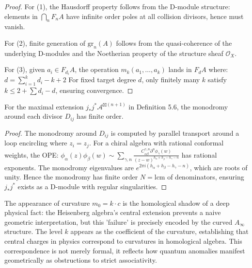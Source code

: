\begin{proof}
For (1), the Hausdorff property follows from the D-module structure: elements in $\bigcap_n F_nA$ have infinite order poles at all collision divisors, hence must vanish.

For (2), finite generation of $\text{gr}_n(A)$ follows from the quasi-coherence of the underlying D-modules and the Noetherian property of the structure sheaf $\mathcal{O}_X$.

For (3), given $a_i \in F_{d_i}A$, the operation $m_k(a_1, \ldots, a_k)$ lands in $F_d A$ where:
$d = \sum_{i=1}^k d_i - k + 2$
For fixed target degree $d$, only finitely many $k$ satisfy $k \leq 2 + \sum d_i - d$, ensuring convergence.
\end{proof}

\begin{theorem}\label{thm:monodromy-finite}
For the maximal extension $j_*j^*\mathcal{A}^{\boxtimes(n+1)}$ in Definition 5.6, the monodromy around each divisor $D_{ij}$ has finite order.
\end{theorem}

\begin{proof}
The monodromy around $D_{ij}$ is computed by parallel transport around a loop encircling where $z_i = z_j$. For a chiral algebra with rational conformal weights, the OPE:
$\phi_\alpha(z)\phi_\beta(w) \sim \sum_{\gamma,n} \frac{C^{\gamma,n}_{\alpha\beta}\partial^n\phi_\gamma(w)}{(z-w)^{h_\alpha + h_\beta - h_\gamma - n}}$
has rational exponents. The monodromy eigenvalues are $e^{2\pi i(h_\alpha + h_\beta - h_\gamma - n)}$, which are roots of unity. Hence the monodromy has finite order $N = \text{lcm}$ of denominators, ensuring $j_*j^*$ exists as a D-module with regular singularities.
\end{proof}

\begin{remark}
The appearance of curvature $m_0 = k \cdot c$ is the homological shadow of a deep physical fact: the Heisenberg algebra's central extension prevents a naive geometric interpretation, but this 'failure' is precisely encoded by the curved $A_\infty$ structure. The level $k$ appears as the coefficient of the curvature, establishing that central charges in physics correspond to curvatures in homological algebra. This correspondence is not merely formal, it reflects how quantum anomalies manifest geometrically as obstructions to strict associativity.
\end{remark}

